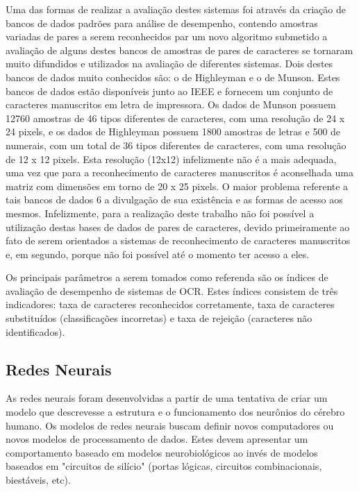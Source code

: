			Uma das formas de realizar a avaliação destes sistemas foi através da criação de bancos de dados padrões para análise de desempenho, contendo amostras variadas de pares a serem reconhecidos par um novo algoritmo submetido a avaliação de alguns destes bancos de amostras de pares de caracteres se tornaram muito difundidos e utilizados na avaliação de diferentes sistemas. Dois destes bancos de dados muito conhecidos são: o de Highleyman e o de Munson. Estes bancos de dados estão disponíveis junto ao IEEE e fornecem um conjunto de caracteres manuscritos em letra de impressora. Os dados de Munson possuem 12760 amostras de 46 tipos diferentes de caracteres, com uma resolução de 24 x 24 pixels, e os dados de Highleyman possuem 1800 amostras de letras e 500 de numerais, com um total de 36 tipos diferentes de caracteres, com uma resolução de 12 x 12 pixels. Esta resolução (12x12) infelizmente não é a mais adequada, uma vez que para a reconhecimento de caracteres manuscritos é aconselhada uma matriz com dimensões em torno de 20 x 25 pixels. O maior problema referente a tais bancos de dados 6 a divulgação de sua existência e as formas de acesso aos mesmos. Infelizmente, para a realização deste trabalho não foi possível a utilização destas bases de dados de pares de caracteres, devido primeiramente ao fato de serem orientados a sistemas de reconhecimento de caracteres manuscritos e, em segundo, porque não foi possível até o momento ter acesso a eles.
			
			Os principais parâmetros a serem tomados como referenda são os índices de avaliação de desempenho de sistemas de OCR. Estes índices consistem de três indicadores: taxa de caracteres reconhecidos corretamente, taxa de caracteres substituídos (classificações incorretas) e taxa de rejeição (caracteres não identificados).

	\subsection{Redes Neurais}
		
		As redes neurais foram desenvolvidas a partir de uma tentativa de criar um modelo que descrevesse a estrutura e o funcionamento dos neurônios do cérebro humano. Os modelos de redes neurais buscam definir novos computadores ou novos modelos de processamento de dados. Estes devem apresentar um comportamento baseado em modelos neurobiológicos ao invés de modelos baseados em "circuitos de silício" (portas lógicas, circuitos combinacionais, biestáveis, etc).
		
